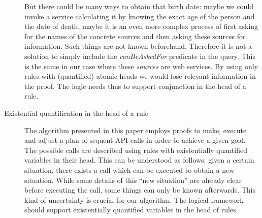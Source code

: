 \begin{description}
%
%
But there could be many ways %
to obtain %
that birth date: maybe we could invoke a service calculating it by knowing the exact age of the person and the date of death, 
maybe it is an even more complex process of first asking for the names of the
concrete sources and then asking these sources for information. Such things are not known beforehand.
Therefore it is not a solution to simply include the \emph{canBeAskedFor} predicate in the query.
This is the same in our case where these \emph{sources} are web services. 
By using only rules with (quantified) atomic heads we would lose relevant information in the proof. 
The logic needs thus to support conjunction in the head of a rule. 
 \item[Existential quantification in the head of a rule]
The algorithm presented in this paper employs proofs to make, execute and adjust a plan of sequent API calls in order to achieve a given goal. 
The possible calls are described using rules with existentially quantified variables in their head. 
This can be understood as follows: given a certain situation, there exists a call which can be executed to obtain a new situation. While some 
details of this ``new situation'' are already clear before executing the call, some things can only be known afterwards.
This kind of uncertainty is crucial for our algorithm. The logical framework should support existentially quantified variables in the head of rules. 
\end{description}


